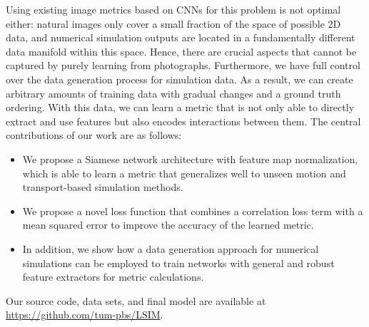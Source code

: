 \documentclass{article}
\begin{document}
Using existing image metrics based on CNNs for this problem is not optimal either: natural images only cover a small fraction of the space of possible 2D data, and numerical simulation outputs are located in a fundamentally different data manifold within this space. Hence, there are crucial aspects that cannot be captured by purely learning from photographs. Furthermore, we have full control over the data generation process for simulation data. 
As a result, we can create arbitrary amounts of training data with gradual changes and a ground truth ordering.
With this data, we can learn a metric that is not only able to directly extract and use features but also encodes interactions between them.
The central contributions of our work are as follows:
\vspace{-0.2cm}
\begin{itemize}
    \setlength\itemsep{0.0cm}
    \item We propose a Siamese network architecture with feature map normalization, which is able to learn a metric that generalizes well to unseen motion and transport-based simulation methods.
    \item We propose a novel loss function that combines a correlation loss term with a mean squared error to improve the accuracy of the learned metric.
    \item In addition, we show how a data generation approach for numerical simulations can be employed to train networks with general and robust feature extractors for metric calculations.
\end{itemize}
\vspace{-0.2cm}
Our source code, data sets, and final model are available at \url{https://github.com/tum-pbs/LSIM}.


\end{document}
